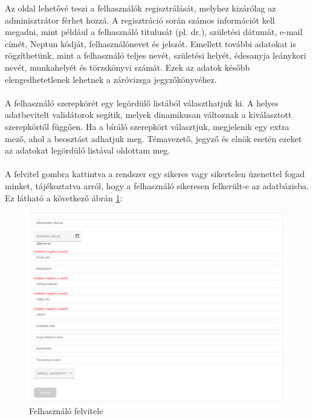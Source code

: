 Az oldal lehetővé teszi a felhasználók regisztrálását, melyhez kizárólag az adminisztrátor férhet hozzá. A regisztráció során számos információt kell megadni, mint például a felhasználó titulusát (pl. dr.), születési dátumát, e-mail címét, Neptun kódját, felhasználónevet és jelszót. Emellett további adatokat is rögzíthetünk, mint a felhasználó teljes nevét, születési helyét, édesanyja leánykori nevét, munkahelyét és törzskönyvi számát. Ezek az adatok később elengedhetetlenek lehetnek a záróvizsga jegyzőkönyvéhez.\\
\\
A felhasználó szerepkörét egy legördülő listából választhatjuk ki. A helyes adatbevitelt validátorok segítik, melyek dinamikusan változnak a kiválasztott szerepkörtől függően. Ha a bíráló szerepkört választjuk, megjelenik egy extra mező, ahol a beosztást adhatjuk meg. Témavezető, jegyző és elnök esetén ezeket az adatokat legördülő listával oldottam meg.\\
\\
A felvitel gombra kattintva a rendszer egy sikeres vagy sikertelen üzenettel fogad minket, tájékoztatva arról, hogy a felhasználó sikeresen felkerült-e az adatbázisba. Ez látható a következő ábrán \ref{fig:addUsers}:

\begin{figure}[h]
\centering
\includegraphics[width=\textwidth]{images/addUsers.png}
\caption{Felhasználó felvitele}
\label{fig:addUsers}
\end{figure}

\newpage



